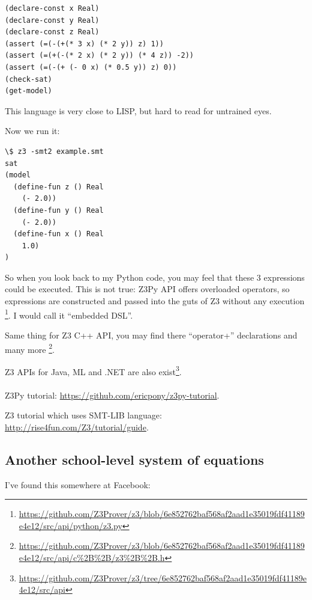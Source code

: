 \begin{lstlisting}
(declare-const x Real)
(declare-const y Real)
(declare-const z Real)
(assert (=(-(+(* 3 x) (* 2 y)) z) 1))
(assert (=(+(-(* 2 x) (* 2 y)) (* 4 z)) -2))
(assert (=(-(+ (- 0 x) (* 0.5 y)) z) 0))
(check-sat)
(get-model)
\end{lstlisting}

This language is very close to LISP, but hard to read for untrained eyes.

Now we run it:

\begin{lstlisting}
\$ z3 -smt2 example.smt
sat
(model
  (define-fun z () Real
    (- 2.0))
  (define-fun y () Real
    (- 2.0))
  (define-fun x () Real
    1.0)
)
\end{lstlisting}

So when you look back to my Python code, you may feel that these 3 expressions could be executed.
This is not true: Z3Py API offers overloaded operators, so expressions are constructed and passed into the guts of Z3 without any execution
\footnote{\url{https://github.com/Z3Prover/z3/blob/6e852762baf568af2aad1e35019fdf41189e4e12/src/api/python/z3.py}}.
I would call it ``embedded \ac{DSL}''.

Same thing for Z3 C++ API, you may find there ``operator+'' declarations and many more
\footnote{\url{https://github.com/Z3Prover/z3/blob/6e852762baf568af2aad1e35019fdf41189e4e12/src/api/c\%2B\%2B/z3\%2B\%2B.h}}.

Z3 APIs for Java, ML and .NET are also exist\footnote{\url{https://github.com/Z3Prover/z3/tree/6e852762baf568af2aad1e35019fdf41189e4e12/src/api}}.\\
\\
Z3Py tutorial: \url{https://github.com/ericpony/z3py-tutorial}.

Z3 tutorial which uses SMT-LIB language: \url{http://rise4fun.com/Z3/tutorial/guide}.

\subsection{Another school-level system of equations}

I've found this somewhere at Facebook:


